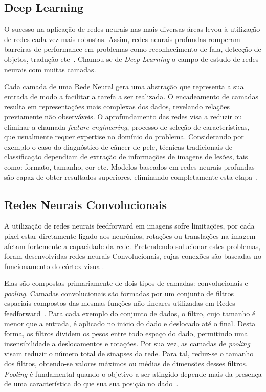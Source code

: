 \subsection{Deep Learning}


O sucesso na aplicação de redes neurais nas mais diversas áreas levou à utilização de redes cada vez mais robustas.
Assim, redes neurais profundas romperam barreiras de performance em problemas como reconhecimento de fala, detecção de
objetos, tradução etc~\cite{lecun15}.
Chamou-se de \textit{Deep Learning} o campo de estudo de redes neurais com muitas camadas.

Cada camada de uma Rede Neural gera uma abstração que representa a sua entrada de modo a facilitar a tarefa a ser
realizada.
O encadeamento de camadas resulta em representações mais complexas dos dados, revelando relações previamente não
observáveis.
O aprofundamento das redes visa a reduzir ou eliminar a chamada \textit{feature engineering}, processo de seleção de
características, que usualmente requer expertise no domínio do problema.
Considerando por exemplo o caso do diagnóstico de câncer de pele, técnicas tradicionais de classificação dependiam de
extração de informações de imagens de lesões, tais como: formato, tamanho, cor etc.
Modelos baseados em redes neurais profundas são capaz de obter resultados superiores, eliminando completamente esta
etapa~\cite{esteva17}.

\subsection{Redes Neurais Convolucionais} \label{sec:convolucionais}

A utilização de redes neurais feedforward em imagens sofre limitações, por cada pixel estar diretamente ligado aos
neurônios, rotações ou translações na imagem afetam fortemente a capacidade da rede.
Pretendendo solucionar estes problemas, foram desenvolvidas redes neurais Convolucionais, cujas conexões são baseadas
no funcionamento do córtex visual.

Elas são compostas primariamente de dois tipos de camadas: convolucionais e \textit{pooling}. Camadas convolucionais são formadas por um conjunto de filtros espaciais compostos das mesmas funções não-lineares utilizadas em Redes feedforward~\cite{goodfellow16}. Para cada exemplo do conjunto de dados, o filtro, cujo tamanho é menor que a entrada, é aplicado no inicio do dado e deslocado até o final. Desta forma, os filtros dividem os pesos entre todo espaço do dado, permitindo uma insensibilidade a deslocamentos e rotações. Por sua vez, as camadas de \textit{pooling} visam reduzir o número total de sinapses da rede. Para tal, reduz-se o tamanho dos filtros, obtendo-se valores máximos ou médias de dimensões desses filtros. \textit{Pooling} é fundamental quando o objetivo a ser atingido depende mais da presença de uma característica do que sua sua posição no dado~\cite{goodfellow16}.


